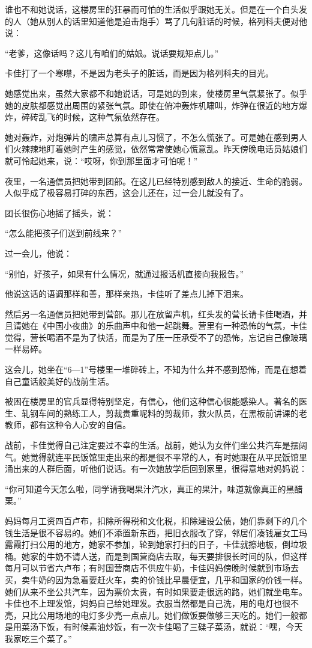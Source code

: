 谁也不和她说话，这楼房里的狂暴而可怕的生活似乎跟她无关。但是在一个白头发的人（她从别人的话里知道他是迫击炮手）骂了几句脏话的时候，格列科夫便对他说：

“老爹，这像话吗？这儿有咱们的姑娘。说话要规矩点儿。”

卡佳打了一个寒噤，不是因为老头子的脏话，而是因为格列科夫的目光。

她感觉出来，虽然大家都不和她说话，可是她的到来，使楼房里气氛紧张了。似乎她的皮肤都感觉出周围的紧张气氛。即使在俯冲轰炸机啸叫，炸弹在很近的地方爆炸，碎砖乱飞的时候，这种气氛依然存在。

她对轰炸，对炮弹片的啸声总算有点儿习惯了，不怎么慌张了。可是她在感到男人们火辣辣地盯着她时产生的感觉，依然常常使她心慌意乱。昨天傍晚电话员姑娘们就可怜起她来，说：“哎呀，你到那里面才可怕呢！”

夜里，一名通信员把她带到团部。在这儿已经特别感到敌人的接近、生命的脆弱。人似乎成了极容易打碎的东西，这会儿还在，过一会儿就没有了。

团长很伤心地摇了摇头，说：

“怎么能把孩子们送到前线来？”

过一会儿，他说：

“别怕，好孩子，如果有什么情况，就通过报话机直接向我报告。”

他说这话的语调那样和善，那样亲热，卡佳听了差点儿掉下泪来。

然后另一名通信员把她带到营部。那儿在放留声机，红头发的营长请卡佳喝酒，并且请她在《中国小夜曲》的乐曲声中和他一起跳舞。营里有一种恐怖的气氛，卡佳觉得，营长喝酒不是为了快活，而是为了压一压承受不了的恐怖，忘记自己像玻璃一样易碎。

这会儿，她坐在“6—1”号楼里一堆碎砖上，不知为什么并不感到恐怖，而是在想着自己童话般美好的战前生活。

被困在楼房里的官兵显得特别坚定，有信心，他们这种信心很能感染人。著名的医生、轧钢车间的熟练工人，剪裁贵重呢料的剪裁师，救火队员，在黑板前讲课的老教师，都有这种令人心安的自信。

战前，卡佳觉得自己注定要过不幸的生活。战前，她认为女伴们坐公共汽车是摆阔气。她觉得就连平民饭馆里走出来的都是很不平常的人，有时她跟在从平民饭馆里涌出来的人群后面，听他们说话。有一次她放学后回到家里，很得意地对妈妈说：

“你可知道今天怎么啦，同学请我喝果汁汽水，真正的果汁，味道就像真正的黑醋栗。”

妈妈每月工资四百卢布，扣除所得税和文化税，扣除建设公债，她们靠剩下的几个钱生活是很不容易的。她们不添置新东西，把旧衣服改了穿，邻居们凑钱雇女工玛露霞打扫公用的地方，她家不参加，轮到她家打扫的日子，卡佳就擦地板，倒垃圾桶。她家的牛奶不请人送，而是到国营商店去取，每天要排很长时间的队，但这样每月可以节省六卢布；有时国营商店不供应牛奶，卡佳妈妈傍晚时候就到市场去买，卖牛奶的因为急着要赶火车，卖的价钱比早晨便宜，几乎和国家的价钱一样。她们从来不坐公共汽车，因为票价太贵，有时如果要走很远的路，她们就坐电车。卡佳也不上理发馆，妈妈自己给她理发。衣服当然都是自己洗，用的电灯也很不亮，只比公用场地的电灯多少亮一点点儿。她们做饭要做够三天吃的。她们一般都是用菜汤下饭，有时候素油炒饭，有一次卡佳喝了三碟子菜汤，就说：“嘿，今天我家吃三个菜了。”

